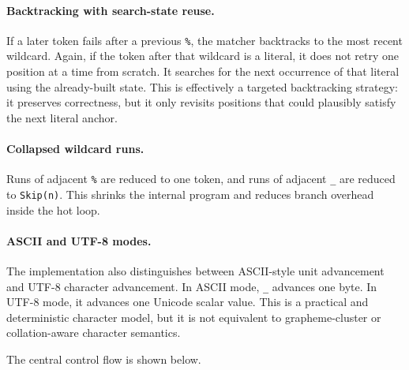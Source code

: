 \documentclass[11pt]{article}
\begin{document}
\paragraph{Backtracking with search-state reuse.}
If a later token fails after a previous \texttt{\%}, the matcher backtracks to the most recent wildcard. Again, if the token after that wildcard is a literal, it does not retry one position at a time from scratch. It searches for the next occurrence of that literal using the already-built state. This is effectively a targeted backtracking strategy: it preserves correctness, but it only revisits positions that could plausibly satisfy the next literal anchor.

\paragraph{Collapsed wildcard runs.}
Runs of adjacent \texttt{\%} are reduced to one token, and runs of adjacent \texttt{\_} are reduced to \texttt{Skip(n)}. This shrinks the internal program and reduces branch overhead inside the hot loop.

\paragraph{ASCII and UTF-8 modes.}
The implementation also distinguishes between ASCII-style unit advancement and UTF-8 character advancement. In ASCII mode, \texttt{\_} advances one byte. In UTF-8 mode, it advances one Unicode scalar value. This is a practical and deterministic character model, but it is not equivalent to grapheme-cluster or collation-aware character semantics.

The central control flow is shown below.
\end{document}
